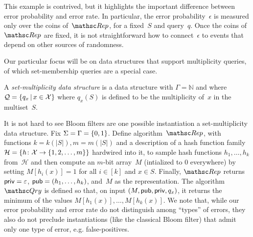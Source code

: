 This example is contrived, but it highlights the important
difference between error probability and error rate.  In particular,
the error probability~$\epsilon$ is measured only over the coins
of~$\Rep$, for a fixed~$S$ and query~$q$. Once the coins of~$\Rep$
are fixed, it is not straightforward how to connect~$\epsilon$ to
events that depend on other sources of randomness. 


 Our particular focus
will be on data structures that support multiplicity queries, of
which set-membership queries are a special case.
\begin{definition} A \emph{set-multiplicity data structure} is a data
structure with $\Gamma=\mathbb{N}$ and
where ${\cal Q}=\{q_x \,|\, x \in {\cal X}\}$ where $q_x(S)$ is defined to
be the multiplicity of~$x$ in the multiset~$S$. \hfill\dqed
\end{definition}
%


It is not hard to see Bloom filters are one possible instantiation a
set-multiplicity data structure.  Fix $\Sigma=\Gamma=\{0,1\}$.  Define
algorithm~$\Rep$, with functions $k=k(|S|), m=m(|S|)$ and a
description of a hash function family~$\mathcal{H}=\{h \colon {\cal X}
\to \{1,2,\ldots,m\}\}$ hardwired into it, to sample hash functions
$h_1, \ldots, h_k$ from~$\mathcal{H}$ and then compute an $m$-bit
array~$M$ (intialized to 0 everywhere) by setting $M[h_i(x)]=1$ for
all $i\in [k]$ and $x \in S$.  Finally, $\Rep$ returns
${\sf priv}=\varepsilon$, ${\sf pub} = (h_1,\ldots, h_k)$, and~$M$ as the
representation.  
%
The algorithm~$\Qry$ is defined so that, on input $(M,{\sf pub},{\sf priv},q_x)$, it
returns the minimum of the values $M[h_1(x)],\ldots,M[h_k(x)]$.  We note that, while our error
probability and error rate do not distinguish among ``types'' of
errors, they also do not preclude instantiations (like the classical
Bloom filter) that admit only one type of error, e.g.
false-positives.

